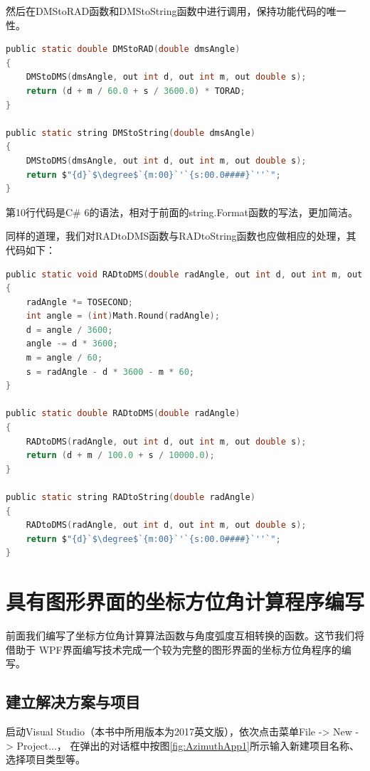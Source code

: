 然后在DMStoRAD函数和DMStoString函数中进行调用，保持功能代码的唯一性。

\begin{lstlisting}[language=C]
public static double DMStoRAD(double dmsAngle)
{
    DMStoDMS(dmsAngle, out int d, out int m, out double s);
    return (d + m / 60.0 + s / 3600.0) * TORAD;
}

public static string DMStoString(double dmsAngle)
{
    DMStoDMS(dmsAngle, out int d, out int m, out double s);
    return $"{d}`$\degree$`{m:00}`'`{s:00.0####}`''`";
}
\end{lstlisting}

第10行代码是C\# 6的语法，相对于前面的string.Format函数的写法，更加简洁。

同样的道理，我们对RADtoDMS函数与RADtoString函数也应做相应的处理，其代码如下：
\begin{lstlisting}[language=C]
public static void RADtoDMS(double radAngle, out int d, out int m, out double s)
{
    radAngle *= TOSECOND;
    int angle = (int)Math.Round(radAngle);
    d = angle / 3600;
    angle -= d * 3600;
    m = angle / 60;
    s = radAngle - d * 3600 - m * 60;
}

public static double RADtoDMS(double radAngle)
{
    RADtoDMS(radAngle, out int d, out int m, out double s);
    return (d + m / 100.0 + s / 10000.0);
}

public static string RADtoString(double radAngle)
{
    RADtoDMS(radAngle, out int d, out int m, out double s);
    return $"{d}`$\degree$`{m:00}`'`{s:00.0####}`''`";
}
\end{lstlisting}


\section{具有图形界面的坐标方位角计算程序编写}

前面我们编写了坐标方位角计算算法函数与角度弧度互相转换的函数。这节我们将借助于
WPF界面编写技术完成一个较为完整的图形界面的坐标方位角程序的编写。

\subsection{建立解决方案与项目}
启动Visual Studio（本书中所用版本为2017英文版），依次点击菜单File -> New -> Project...，
在弹出的对话框中按图\ref{fig:AzimuthApp1}所示输入新建项目名称、选择项目类型等。

